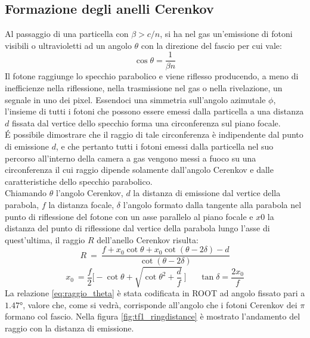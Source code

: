 \documentclass[8pt]{extarticle}
\begin{document}
\subsection{Formazione degli anelli Cerenkov}
Al passaggio di una particella con $\beta > c/n$, si ha nel gas un'emissione di fotoni visibili o ultravioletti ad un angolo $\theta$ con la direzione del fascio per cui vale:
\begin{equation} \label{eq:cerenkov}
\cos{\theta}=\frac{1}{\beta n}
\end{equation}
Il fotone raggiunge lo specchio parabolico e viene riflesso producendo, a meno di inefficienze nella riflessione, nella trasmissione nel gas o nella rivelazione, un segnale in uno dei pixel. Essendoci una simmetria sull'angolo azimutale $\phi$, l'insieme di tutti i fotoni che possono essere emessi dalla particella a una distanza $d$ fissata dal vertice dello specchio forma una circonferenza sul piano focale.\\
\'E possibile dimostrare che il raggio di tale circonferenza è indipendente dal punto di emissione $d$, e che pertanto tutti i fotoni emessi dalla particella nel suo percorso all'interno della camera a gas vengono messi a fuoco su una circonferenza il cui raggio dipende solamente dall'angolo Cerenkov e dalle caratteristiche dello specchio parabolico.\\
Chiamando $\theta$ l'angolo Cerenkov, $d$ la distanza di emissione dal vertice della parabola, $f$ la distanza focale, $\delta$ l'angolo formato dalla tangente alla parabola nel punto di riflessione del fotone con un asse parallelo al piano focale e $x0$ la distanza del punto di riflessione dal vertice della parabola lungo l'asse di quest'ultima, il raggio $R$ dell'anello Cerenkov risulta:
\begin{equation} \label{eq:raggio_theta}
R \ = \ \frac{f+x_0 \cot{\theta}+x_0 \cot{(\theta-2\delta)}-d}{\cot{(\theta-2\delta)}}
\end{equation}
\begin{equation}
x_0 \ = \frac{f}{2} \Bigg[-\cot{\theta}+\sqrt{\cot{\theta}^2+\frac{d}{f}}\ \Bigg] \ \ \ \ \ \ \ \tan{\delta}=\frac{2x_0}{f}
\end{equation}
La relazione \eqref{eq:raggio_theta} è stata codificata in ROOT ad angolo fissato pari a $1.47 °$, valore che, come si vedrà, corrisponde all'angolo che i fotoni Cerenkov dei $\pi$ formano col fascio. Nella figura \ref{fig:tf1_ringdistance} è mostrato l'andamento del raggio con la distanza di emissione.\\
\end{document}
